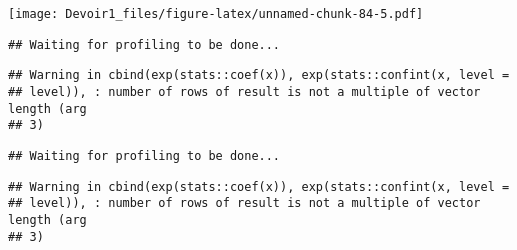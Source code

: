 \documentclass[]{article}
\newenvironment{Shaded}{\begin{snugshade}}{\end{snugshade}}
\newcommand{\KeywordTok}[1]{\textcolor[rgb]{0.13,0.29,0.53}{\textbf{#1}}}
\newcommand{\DataTypeTok}[1]{\textcolor[rgb]{0.13,0.29,0.53}{#1}}
\newcommand{\DecValTok}[1]{\textcolor[rgb]{0.00,0.00,0.81}{#1}}
\newcommand{\StringTok}[1]{\textcolor[rgb]{0.31,0.60,0.02}{#1}}
\newcommand{\OperatorTok}[1]{\textcolor[rgb]{0.81,0.36,0.00}{\textbf{#1}}}
\newcommand{\NormalTok}[1]{#1}
\begin{document}
\texttt{[image: Devoir1\_files/figure-latex/unnamed-chunk-84-5.pdf]}

\begin{Shaded}
\end{Shaded}

\begin{verbatim}
## Waiting for profiling to be done...
\end{verbatim}

\begin{verbatim}
## Warning in cbind(exp(stats::coef(x)), exp(stats::confint(x, level =
## level)), : number of rows of result is not a multiple of vector length (arg
## 3)
\end{verbatim}

\begin{verbatim}
## Waiting for profiling to be done...
\end{verbatim}

\begin{verbatim}
## Warning in cbind(exp(stats::coef(x)), exp(stats::confint(x, level =
## level)), : number of rows of result is not a multiple of vector length (arg
## 3)
\end{verbatim}
\end{document}
